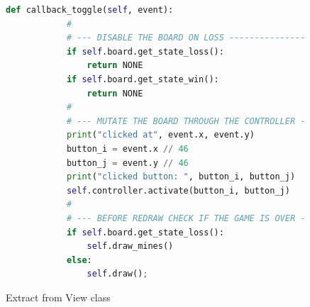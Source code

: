 \documentclass[12pt, a4]{report}
\begin{document}
\begin{figure}[!h]
	\label{view}
	\begin{lstlisting}[language=python]
		def callback_toggle(self, event):
			#
			# --- DISABLE THE BOARD ON LOSS -----------------------------------
			if self.board.get_state_loss():
				return NONE
			if self.board.get_state_win():
				return NONE
			#
			# --- MUTATE THE BOARD THROUGH THE CONTROLLER ---------------------
			print("clicked at", event.x, event.y)
			button_i = event.x // 46
			button_j = event.y // 46
			print("clicked button: ", button_i, button_j)
			self.controller.activate(button_i, button_j)
			#
			# --- BEFORE REDRAW CHECK IF THE GAME IS OVER ---------------------
			if self.board.get_state_loss():
				self.draw_mines()
			else: 
				self.draw();

	\end{lstlisting}
	\caption{Extract from View class}
\end{figure}
\end{document}
